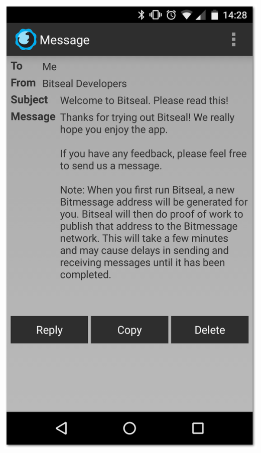 \documentclass{bfh}
\begin{document}
\begin{center}
    \begin{minipage}{.3\linewidth}
      \includegraphics[width=1.0 \textwidth]{images/screenshots/bitseal_message.png}
    \end{minipage}
    \hspace{.03\linewidth}
    \begin{minipage}{.3\linewidth}

\end{minipage}
\end{center}
\end{document}
